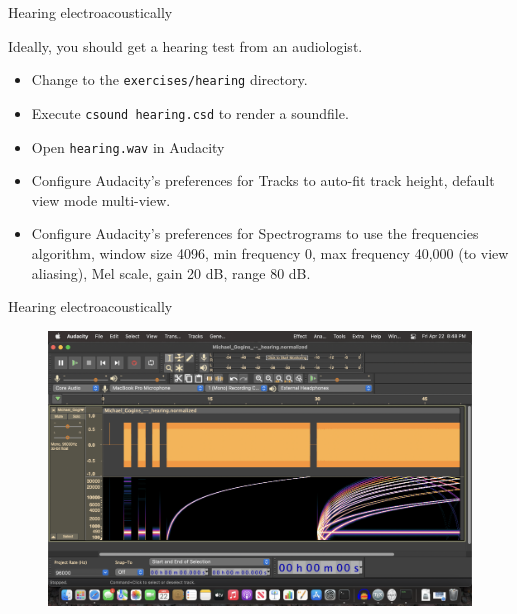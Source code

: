 \documentclass{beamer}
\begin{document}
\begin{frame}{Hearing electroacoustically}
\begin{example}
Ideally, you should get a hearing test from an audiologist.
\begin{itemize}
\item Change to the \texttt{exercises/hearing} directory.
\item Execute \texttt{csound hearing.csd} to render a soundfile.
\item Open \texttt{hearing.wav} in Audacity
\item Configure Audacity's preferences for Tracks to auto-fit track height, default view mode multi-view.
\item Configure Audacity's preferences for Spectrograms to use the frequencies algorithm, window size 4096, min frequency 0, max frequency 40,000 (to view aliasing), Mel scale, gain 20 dB, range 80 dB.
\end{itemize}
\end{example}
\end{frame}

\begin{frame}{Hearing electroacoustically}
\begin{figure}
\centerline{\includegraphics[height = 0.66\textwidth]{hearing}}
\end{figure}
\end{frame}
\end{document}

